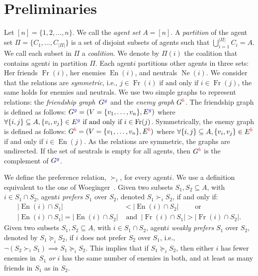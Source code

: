 \documentclass[a4paper,fleqn]{cas-sc}
\newcommand{\friendshipColor}{blue}
\newcommand{\enemyColor}{red}
\newcommand{\agent}{agent\xspace}
\newcommand{\agents}{agents\xspace}
\newcommand{\nbAgents}{\ensuremath{n}\xspace}
\newcommand{\agentSet}{\ensuremath{A}\xspace}
\newcommand{\partition}{\ensuremath{\Pi}\xspace}
\newcommand{\coalition}{\ensuremath{C}\xspace}
\newcommand{\friendSuperscript}{{\color{\friendshipColor}g}}
\newcommand{\enemySuperscript}{{\color{\enemyColor}b}}
\newcommand{\friendshipGraph}{\ensuremath{G^{\friendSuperscript}}\xspace}
\newcommand{\enemyGraph}{\ensuremath{G^{\enemySuperscript}}\xspace}
\newcommand{\friendshipEdgeSet}{\ensuremath{E^{\friendSuperscript}}\xspace}
\newcommand{\enemyEdgeSet}{\ensuremath{E^{\enemySuperscript}}\xspace}
\newcommand{\coalitionOfi}[1]{\ensuremath{\partition(#1)}\xspace}
\DeclareMathOperator{\friendOf}{Fr}
\DeclareMathOperator{\enemiesOf}{En}
\DeclareMathOperator{\neutralsOf}{Ne}
\newcommand{\friendsOfi}[1]{\ensuremath{\friendOf(#1)}\xspace}
\newcommand{\enemiesOfi}[1]{\ensuremath{\enemiesOf(#1)}\xspace}
\newcommand{\neutralsOfi}[1]{\ensuremath{\neutralsOf(#1)}\xspace}
\newcommand{\myemph}[1]{{\color{green!25!black}\emph{#1}}}
\begin{document}
\section{Preliminaries}
\label{sec:preliminaries}
Let $[n]=\{1,2,\dots,n\}$. We call the \myemph{\agent set} $\agentSet=[\nbAgents]$. A \myemph{partition} of the \agent set $\partition=\{\coalition_1, \dots, \coalition_{|\partition|}\}$ is a set of disjoint subsets of \agents such that $\bigcup_{i=1}^{|\partition|} \coalition_i = \agentSet$. We call each subset in \partition a \myemph{coalition}. We denote by $\coalitionOfi{i}$ the coalition that contains \agent $i$ in partition \partition. Each \agent $i$ partitions other agents in three sets: Her friends \friendsOfi{i}, her enemies \enemiesOfi{i}, and neutrals \neutralsOfi{i}. We consider that the relations are \myemph{symmetric}, i.e., $j \in \friendsOfi{i} \text{ if and only if } i \in \friendsOfi{j}$, the same holds for enemies and neutrals. We use two simple graphs to represent relations: the \myemph{friendship graph}~\friendshipGraph and the \myemph{enemy graph} \enemyGraph. The friendship graph is defined as follows: $\friendshipGraph=(V=\{v_1,\dots,v_{\nbAgents}\},\friendshipEdgeSet)$ where $\forall \{i,j\} \subseteq \agentSet, \{v_i,v_j\} \in \friendshipEdgeSet \text{ if and only if } i \in \friendsOfi{j}$. Symmetrically, the enemy graph is defined as follows: $\enemyGraph=(V=\{v_1,\dots,v_{\nbAgents}\},\enemyEdgeSet)$ where $\forall \{i,j\} \subseteq \agentSet, \{v_i,v_j\} \in \enemyEdgeSet$ if and only if  $i \in \enemiesOfi{j}$. As the relations are symmetric, the graphs are undirected. If the set of neutrals is empty for all \agents, then \enemyGraph is the complement of \friendshipGraph.



We define the preference relation, $\succ_i$, for every \agent $i$. We use a definition equivalent to the one of Woeginger~\cite{woeginger2013core}.
Given two subsets $S_1,S_2 \subseteq \agentSet$, with $i\in S_1\cap S_2$, \agent $i$ \myemph{prefers} $S_1$ over $S_2$, denoted $S_1\succ_i S_2$, if and only if: 
\begin{align*}
    |\enemiesOfi{i} \cap S_1| &< |\enemiesOfi{i} \cap S_2| 
   \qquad \text{ or}\\
    |\enemiesOfi{i}\cap S_1| = |\enemiesOfi{i} \cap S_2|
    &\text{ and }~|\friendsOfi{i}\cap S_1| > |\friendsOfi{i}\cap S_2|.    
\end{align*}
Given two subsets $S_1,S_2 \subseteq \agentSet$, with $i\in S_1\cap S_2$, \agent $i$ \myemph{weakly prefers} $S_1$ over $S_2$, denoted by $S_1 \succeq_i S_2$, if $i$ does not prefer $S_2$ over $S_1$, i.e., $\lnot (S_2 \succ_i S_1) \implies S_1 \succeq_i S_2$.
This implies that if $S_1 \succeq_i S_2$, then either $i$ has fewer enemies in~$S_1$ \emph{or} $i$ has the same number of enemies in both, and at least as many friends in $S_1$ as in $S_2$.
\end{document}

